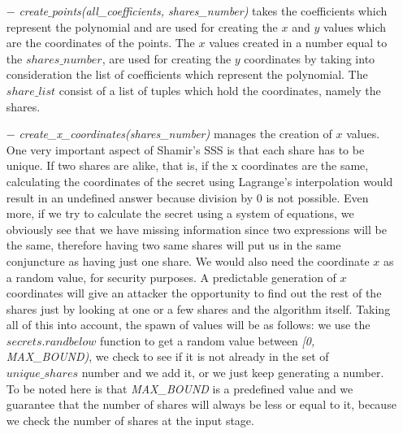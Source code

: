 \documentclass[12pt, a4paper, oneside]{book}
\begin{document}
    \vspace{-0.5cm}
    \begin{itemize}
        \item[$-$] {\it create$\_$points(all\_coefficients, shares\_number)} takes the coefficients which represent the polynomial and are used for creating the $x$ and $y$ values which are the coordinates of the points. The $x$ values created in a number equal to the $shares\_number$, are used for creating the $y$ coordinates by taking into consideration the list of coefficients which represent the polynomial. The $share\_list$ consist of a list of tuples which hold the coordinates, namely the shares.
    \end{itemize}
    \vspace{-0.5cm}
    \begin{itemize}
        \item[$-$] {\it create\_x\_coordinates(shares\_number)} manages the creation of $x$ values. One very important aspect of Shamir's SSS is that each share has to be unique. If two shares are alike, that is, if the x coordinates are the same, calculating the coordinates of the secret using Lagrange's interpolation would result in an undefined answer because division by 0 is not possible. Even more, if we try to calculate the secret using a system of equations, we obviously see that we have missing information since two expressions will be the same, therefore having two same shares will put us in the same conjuncture as having just one share. We would also need the coordinate $x$ as a random value, for security purposes. A predictable generation of $x$ coordinates will give an attacker the opportunity to find out the rest of the shares just by looking at one or a few shares and the algorithm itself. Taking all of this into account, the spawn of values will be as follows: we use the $secrets.randbelow$ function to get a random value between  {\it [0, MAX\_BOUND)}, we check to see if it is not already in the set of $unique\_shares$ number and we add it, or we just keep generating a number. To be noted here is that {\it MAX\_BOUND} is a predefined value and we guarantee that the number of shares will always be less or equal to it, because we check the number of shares at the input stage.
    \end{itemize}
\end{document}
